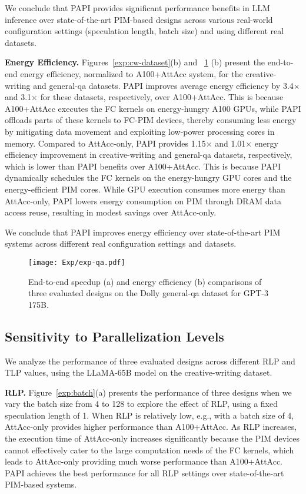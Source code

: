 We conclude that PAPI provides significant performance benefits in LLM inference over state-of-the-art PIM-based designs across various real-world configuration settings (speculation length, batch size) and using different real datasets.


\noindent\textbf{Energy Efficiency.} Figures~\ref{exp:cw-dataset}(b) and ~\ref{exp:qa-dataset} (b) present the end-to-end energy efficiency, normalized to A100+AttAcc system, for the creative-writing and general-qa datasets. PAPI improves average energy efficiency by 3.4× and 3.1× for these datasets, respectively, over A100+AttAcc. 
This is because A100+AttAcc executes the FC kernels on energy-hungry A100 GPUs, while PAPI offloads parts of these kernels to FC-PIM devices, thereby consuming less energy by mitigating data movement and exploiting low-power processing cores in memory. 
Compared to AttAcc-only, PAPI provides 1.15× and 1.01× energy efficiency improvement in creative-writing and general-qa datasets, respectively, which is lower than PAPI benefits over A100+AttAcc.
This is because PAPI dynamically schedules the FC kernels on the energy-hungry GPU cores and the energy-efficient PIM cores. While GPU execution consumes more energy than AttAcc-only, PAPI lowers energy consumption on PIM through DRAM data access reuse, resulting in modest savings over AttAcc-only.

We conclude that PAPI improves energy efficiency over state-of-the-art PIM systems across different real configuration settings and datasets.

\begin{figure}[t]
\centering
\texttt{[image: Exp/exp-qa.pdf]}
\caption{End-to-end speedup (a) and energy efficiency (b) comparisons of three evaluated designs on the Dolly general-qa dataset for GPT-3 175B.}
\label{exp:qa-dataset}

\end{figure}

\subsection{Sensitivity to Parallelization Levels}
We analyze the performance of three evaluated designs across different RLP and TLP values, using the LLaMA-65B model on the creative-writing dataset.

\noindent\textbf{RLP.} Figure~\ref{exp:batch}(a) presents the performance of three designs when we vary the batch size from 4 to 128 to explore the effect of RLP, using a fixed speculation length of 1. When RLP is relatively low, e.g., with a batch size of 4, AttAcc-only provides higher performance than A100+AttAcc. As RLP increases, the execution time of AttAcc-only increases significantly because the PIM devices cannot effectively cater to the large computation needs of the FC kernels, which leads to AttAcc-only providing much worse performance than A100+AttAcc. PAPI achieves the best performance for all RLP settings over state-of-the-art PIM-based systems.


